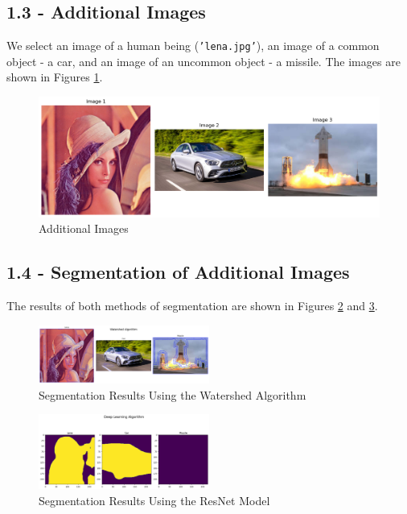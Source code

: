 \documentclass{article}
\begin{document}
\subsection*{1.3 - Additional Images}

We select an image of a human being (\texttt{'lena.jpg'}), an image of a common object - a car, and an image of an uncommon object - a missile. The images are shown in Figures \ref{fig:1_3_imgs}.

\begin{figure}
    \centering
    \includegraphics[width=\textwidth]{../output/1.3_imgs.png}
    \caption{Additional Images}
    \label{fig:1_3_imgs}
\end{figure}

\subsection*{1.4 - Segmentation of Additional Images}

The results of both methods of segmentation are shown in Figures \ref{fig:1_4_watershed} and \ref{fig:1_4_resnet}.

\begin{figure}[h!]
    \centering
    \includegraphics[width=0.5\textwidth]{../output/1.4_watershed.png}
    \caption{Segmentation Results Using the Watershed Algorithm}
    \label{fig:1_4_watershed}
\end{figure}

\begin{figure}[h!]
    \centering
    \includegraphics[width=0.5\textwidth]{../output/1.4_deep.png}
    \caption{Segmentation Results Using the ResNet Model}
    \label{fig:1_4_resnet}
\end{figure}
\end{document}
